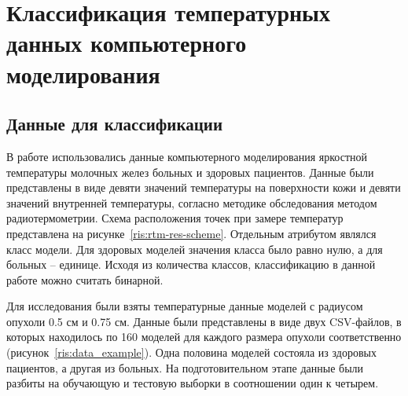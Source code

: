 \newpage
\section{\Large Классификация температурных данных компьютерного моделирования}\vspace{-7mm}
\subsection{Данные для классификации}
В работе использовались данные компьютерного моделирования яркостной температуры молочных желез больных и здоровых пациентов. Данные были представлены в виде девяти значений температуры на поверхности кожи и девяти значений внутренней температуры, согласно методике обследования методом радиотермометрии. Схема расположения точек при замере температур представлена на рисунке~\ref{ris:rtm-res-scheme}. Отдельным атрибутом являлся класс модели. Для здоровых моделей значения класса было равно нулю, а для больных -- единице. Исходя из количества классов, классификацию в данной работе можно считать бинарной.
\\
\par
Для исследования были взяты температурные данные моделей с радиусом опухоли 0.5 см и 0.75 см. Данные были представлены в виде двух CSV-файлов, в которых находилось по 160 моделей для каждого размера опухоли соответственно (рисунок~\ref{ris:data_example}). Одна половина моделей состояла из здоровых пациентов, а другая из больных. На подготовительном этапе данные были разбиты на обучающую и тестовую выборки в соотношении один к четырем.
\\


